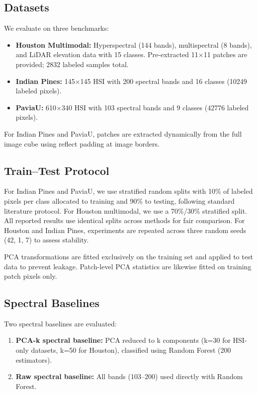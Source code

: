 \documentclass[
  journal]{IEEEtran}
\providecommand{\tightlist}{%
  \setlength{\itemsep}{0pt}\setlength{\parskip}{0pt}}
\begin{document}
\subsection{Datasets}\label{datasets}

We evaluate on three benchmarks:

\begin{itemize}
\tightlist
\item
  \textbf{Houston Multimodal:} Hyperspectral (144 bands), multispectral
  (8 bands), and LiDAR elevation data with 15 classes. Pre-extracted
  11\(\times\)11 patches are provided; 2832 labeled samples total.
\item
  \textbf{Indian Pines:} 145\(\times\)145 HSI with 200 spectral bands and 16
  classes (10249 labeled pixels).
\item
  \textbf{PaviaU:} 610\(\times\)340 HSI with 103 spectral bands and 9 classes
  (42776 labeled pixels).
\end{itemize}

For Indian Pines and PaviaU, patches are extracted dynamically from the
full image cube using reflect padding at image borders.

\subsection{Train--Test Protocol}\label{traintest-protocol}

For Indian Pines and PaviaU, we use stratified random splits with 10\%
of labeled pixels per class allocated to training and 90\% to testing,
following standard literature protocol. For Houston multimodal, we use a
70\%/30\% stratified split. All reported results use identical splits
across methods for fair comparison. For Houston and Indian Pines,
experiments are repeated across three random seeds (42, 1, 7) to assess
stability.

PCA transformations are fitted exclusively on the training set and
applied to test data to prevent leakage. Patch-level PCA statistics are
likewise fitted on training patch pixels only.

\subsection{Spectral Baselines}\label{spectral-baselines}

Two spectral baselines are evaluated:

\begin{enumerate}
\def\labelenumi{\arabic{enumi}.}
\tightlist
\item
  \textbf{PCA-k spectral baseline:} PCA reduced to k components (k=30
  for HSI-only datasets, k=50 for Houston), classified using Random
  Forest (200 estimators).
\item
  \textbf{Raw spectral baseline:} All bands (103--200) used directly
  with Random Forest.
\end{enumerate}
\end{document}
